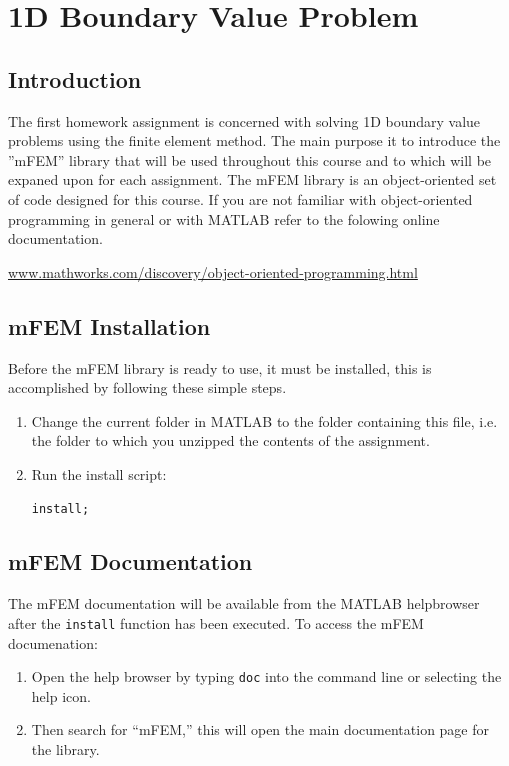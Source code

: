\chapter{1D Boundary Value Problem}
\section*{Introduction}
The first homework assignment is concerned with solving 1D boundary value problems using the finite element method. The main purpose it to introduce the ''mFEM'' library that will be used throughout this course and to which will be expaned upon for each assignment. The mFEM library is an object-oriented set of code designed for this course. If you are not familiar with object-oriented programming in general or with MATLAB refer to the folowing online documentation. 
\begin{center}
\href{http://www.mathworks.com/discovery/object-oriented-programming.html}{www.mathworks.com/discovery/object-oriented-programming.html}
\end{center}

\section*{mFEM Installation}
Before the mFEM library is ready to use, it must be installed, this is accomplished by following these simple steps.
\begin{enumerate}
\item Change the current folder in MATLAB to the folder containing this file, i.e. the folder to which you unzipped the contents of the assignment.
\item Run the install script:
\begin{lstlisting}
install;
\end{lstlisting} 
\end{enumerate}
\section*{mFEM Documentation}
The mFEM documentation will be available from the MATLAB helpbrowser after the \texttt{install} function has been executed. To access the mFEM documenation:
\begin{enumerate}
\item Open the help browser by typing \texttt{doc} into the command line or selecting the help icon. 
\item Then search for ``mFEM,'' this will open the main documentation page for the library.
\end{enumerate}


